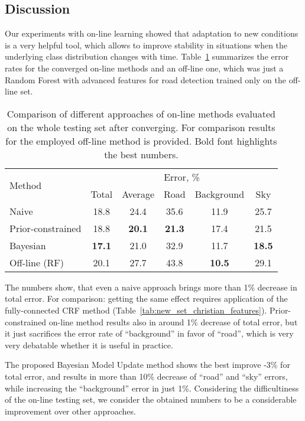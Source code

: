 \subsection{Discussion}

Our experiments with on-line learning showed that adaptation to new conditions is a very helpful tool, which allows to improve stability in
situations when the underlying class distribution changes with time. Table~\ref{tab:on_line_converged} summarizes the error rates for the converged
on-line methods and an off-line one, which was just a Random Forest with advanced features for road detection trained only on the off-line set.

\begin{table}[ht]
 \centering
 \begin{tabular}{|l|c|c|c|c|c|}
 \hline
  \multirow{2}{*}{Method} & \multicolumn{5}{|c|}{Error, \%} \\
  \cline{2-6}
   & Total & Average & Road & Background & Sky \\
  \hline
  Naive & 18.8 & 24.4 & 35.6 & 11.9 & 25.7 \\
  Prior-constrained & 18.8 & {\bf 20.1} & {\bf 21.3} & 17.4 & 21.5 \\
  Bayesian & {\bf 17.1} & 21.0 & 32.9 & 11.7 & {\bf 18.5} \\
  \hline
  \hline
  Off-line (RF) & 20.1 & 27.7 & 43.8 & {\bf 10.5} & 29.1 \\
  \hline
 \end{tabular}
  \caption{Comparison of different approaches of on-line methods evaluated on the whole testing set after converging. For comparison results for
  the employed off-line method is provided.
  Bold font highlights the best numbers.}
\label{tab:on_line_converged}
\end{table}

The numbers show, that even a naive approach brings more than 1\% decrease in total error. For comparison: getting the same effect requires application
of the fully-connected CRF method (Table~\ref{tab:new_set_christian_features}). Prior-constrained on-line method results also in around 1\% decrease
of total error, but it just sacrifices the error rate of ``background'' in favor of ``road'', which is very very debatable whether it is useful in practice.

The proposed Bayesian Model Update method shows the best improve -3\% for total error, and results in more than 10\% decrease of ``road'' and ``sky'' errors,
while increasing the ``background'' error in just 1\%. Considering the difficultiness of the on-line testing set, we consider the obtained numbers to
be a considerable improvement over other approaches.
